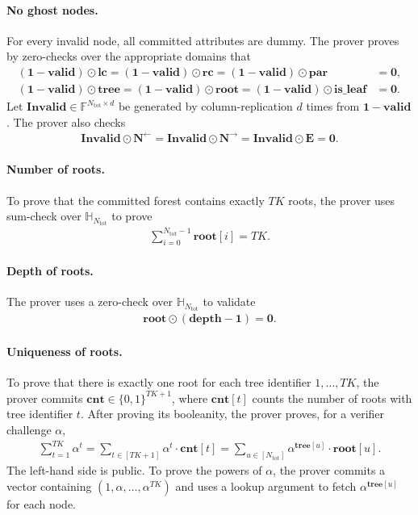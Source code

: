 \paragraph{No ghost nodes.}
For every invalid node, all committed attributes are dummy.  The prover proves
by zero-checks over the appropriate domains that
\begin{align}
    (\mathbf{1}-\mathbf{valid})\odot\mathbf{lc}
    =
    (\mathbf{1}-\mathbf{valid})\odot\mathbf{rc}
    =
    (\mathbf{1}-\mathbf{valid})\odot\mathbf{par}
    &=\mathbf{0},\\
    (\mathbf{1}-\mathbf{valid})\odot\mathbf{tree}
    =
    (\mathbf{1}-\mathbf{valid})\odot\mathbf{root}
    =
    (\mathbf{1}-\mathbf{valid})\odot\mathbf{is\_leaf}
    &=\mathbf{0}.
\end{align}
Let $\mathbf{Invalid}\in\mathbb{F}^{N_{\mathrm{tot}}\times d}$ be generated by
column-replication $d$ times from $\mathbf{1}-\mathbf{valid}$.  The prover also
checks
\begin{align}
    \mathbf{Invalid}\odot\mathbf{N}^{\leftarrow}
    =
    \mathbf{Invalid}\odot\mathbf{N}^{\rightarrow}
    =
    \mathbf{Invalid}\odot\mathbf{E}
    =
    \mathbf{0}.
\end{align}

\paragraph{Number of roots.}
To prove that the committed forest contains exactly $TK$ roots, the prover uses
sum-check over $\mathbb{H}_{N_{\mathrm{tot}}}$ to prove
\begin{align}
    \sum_{i=0}^{N_{\mathrm{tot}}-1}\mathbf{root}[i]=TK.
\end{align}

\paragraph{Depth of roots.}
The prover uses a zero-check over $\mathbb{H}_{N_{\mathrm{tot}}}$ to validate
\begin{align}
    \mathbf{root}\odot(\mathbf{depth}-\mathbf{1})=\mathbf{0}.
\end{align}

\paragraph{Uniqueness of roots.}
To prove that there is exactly one root for each tree identifier
$1,\ldots,TK$, the prover commits
$\mathbf{cnt}\in\{0,1\}^{TK+1}$, where $\mathbf{cnt}[t]$ counts the number of
roots with tree identifier $t$. After proving its booleanity, the prover proves,
for a verifier challenge $\alpha$,
\begin{align}
    \sum_{t=1}^{TK}\alpha^t
    =
    \sum_{t\in[TK+1]}\alpha^t\cdot\mathbf{cnt}[t]
    =
    \sum_{u\in[N_{\mathrm{tot}}]}\alpha^{\mathbf{tree}[u]}\cdot\mathbf{root}[u].
\end{align}
The left-hand side is public. To prove the powers of $\alpha$, the prover
commits a vector containing $(1,\alpha,\ldots,\alpha^{TK})$ and uses a lookup
argument to fetch $\alpha^{\mathbf{tree}[u]}$ for each node.

